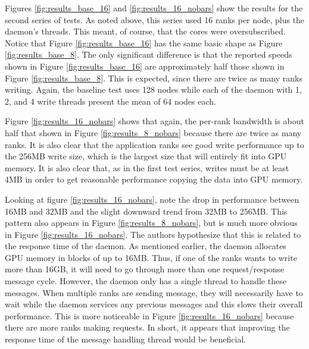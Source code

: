 
Figures \ref{fig:results_base_16} and \ref{fig:results_16_nobars} show the results for the second series of tests.  As noted above, this series used 16 ranks per node, plus the daemon's threads.  This meant, of course, that the cores were oversubscribed.  Notice that Figure \ref{fig:results_base_16} has the same basic shape as Figure \ref{fig:results_base_8}.  The only significant difference is that the reported speeds shown in Figure \ref{fig:results_base_16} are approximately half those shown in Figure \ref{fig:results_base_8}.  This is expected, since there are twice as many ranks writing. Again, the baseline test uses 128 nodes while each of the daemon with 1, 2, and 4 write threads present the mean of 64 nodes each.

Figure \ref{fig:results_16_nobars} shows that again, the per-rank bandwidth is about half that shown in Figure \ref{fig:results_8_nobars} because there are twice as many ranks.  It is also clear that the application ranks see good write performance up to the 256MB write size, which is the largest size that will entirely fit into GPU memory.  It is also clear that, as in the first test series, writes must be at least 4MB in order to get reasonable performance copying the data into GPU memory.


Looking at figure \ref{fig:results_16_nobars}, note the drop in performance between 16MB and 32MB and the slight downward trend from 32MB to 256MB.  This pattern also appears in Figure \ref{fig:results_8_nobars}, but is much more obvious in Figure 
\ref{fig:results_16_nobars}.  The authors hypothesize that this is related to the response time of the daemon.  As mentioned earlier, the daemon allocates GPU memory in blocks of up to 16MB.  Thus, if one of the ranks wants to write more than 16GB, it will need to go through more than one request/response message cycle.  However, the daemon only has a single thread to handle these messages.  When multiple ranks are sending message, they will necessarily have to wait while the daemon services any previous messages and this slows their overall performance.  This is more noticeable in Figure 
\ref{fig:results_16_nobars} because there are more ranks making requests.
In short, it appears that improving the response time of the message handling thread would be beneficial.

